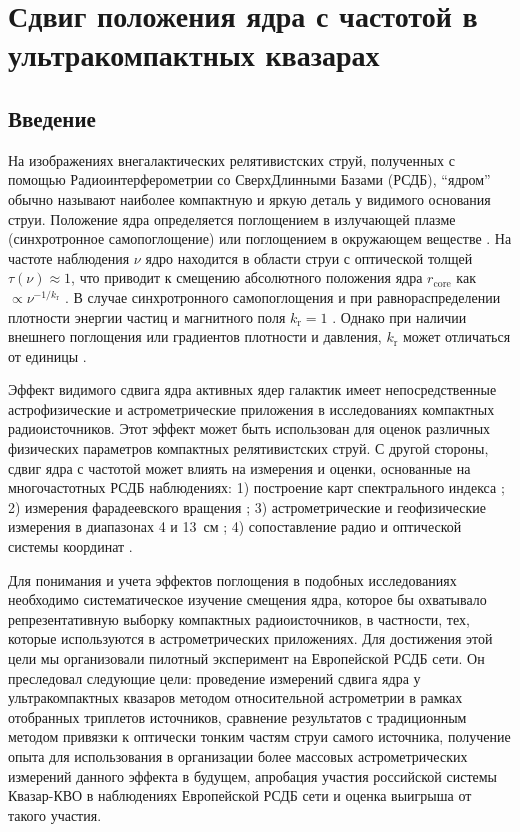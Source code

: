 \graphicspath{{Dissertation/images/chapt1/}}


\chapter{Сдвиг положения ядра с частотой в ультракомпактных квазарах} \label{chapt1}


\section{Введение}
На изображениях внегалактических релятивистских струй, полученных с помощью Радиоинтерферометрии со
СверхДлинными Базами (РСДБ), ``ядром'' обычно называют наиболее компактную и яркую деталь у видимого
основания струи. Положение ядра определяется поглощением в излучающей плазме (синхротронное
самопоглощение) или поглощением в окружающем веществе
\cite{Blandford_Konigl_1979,Konigl_1981,Lobanov_1998}. На частоте наблюдения $\nu$ ядро находится в
области струи с оптической толщей $\tau(\nu) \approx 1$, что приводит к смещению абсолютного
положения ядра $r_\mathrm{core}$ как $\propto \nu^{-1/k_{\mathrm{r}}}$ \cite{Lobanov_1998}. В случае
синхротронного самопоглощения и при равнораспределении плотности энергии частиц и магнитного поля
$k_\mathrm{r} = 1$ \cite{Blandford_Konigl_1979}. Однако при наличии внешнего поглощения или
градиентов плотности и давления, $k_\mathrm{r}$ может отличаться от единицы \cite{Lobanov_1998}.

Эффект видимого сдвига ядра активных ядер галактик имеет непосредственные астрофизические и
астрометрические приложения в исследованиях компактных радиоисточников. Этот эффект может быть
использован для оценок
различных физических параметров компактных релятивистских струй. С другой стороны, сдвиг ядра с
частотой может влиять на измерения и оценки, основанные на многочастотных РСДБ наблюдениях: 1)
построение карт спектрального индекса \cite{Lobanov_1998,Kovalev_2008}; 2) измерения фарадеевского
вращения \cite{Hovatta_2012,Krav2016,Krav2017}; 3) астрометрические и геофизические измерения в
диапазонах 4 и 13~см \cite{Ma_1998,Petrov2009}; 4) сопоставление радио и оптической системы
координат \cite{PK_letter2017,KPP2017,PK2017}.

Для понимания и учета эффектов поглощения в подобных исследованиях необходимо систематическое
изучение смещения ядра, которое бы охватывало репрезентативную выборку компактных радиоисточников, в
частности, тех, которые используются в астрометрических приложениях. Для достижения этой цели мы
организовали пилотный эксперимент на Европейской РСДБ сети. Он преследовал следующие цели:
проведение измерений сдвига ядра у ультракомпактных квазаров методом относительной астрометрии в
рамках отобранных триплетов источников, сравнение результатов с традиционным методом
привязки к оптически тонким частям струи самого источника, получение опыта для использования в
организации более массовых астрометрических измерений данного эффекта в будущем, апробация участия
российской системы Квазар-КВО в наблюдениях Европейской РСДБ сети и оценка выигрыша от такого
участия.

